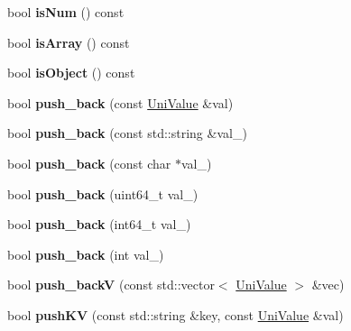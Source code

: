 \begin{DoxyCompactItemize}
bool {\bfseries is\+Num} () const
\item 
\mbox{\label{class_uni_value_a1d2e9479d4fb330a73e0fd41197aec35}} 
bool {\bfseries is\+Array} () const
\item 
\mbox{\label{class_uni_value_af1a6df88c2bee59a863dd6f8d12e9be5}} 
bool {\bfseries is\+Object} () const
\item 
\mbox{\label{class_uni_value_a944cd1b59b040cd24c9f46b55a68d49a}} 
bool {\bfseries push\+\_\+back} (const \mbox{\hyperlink{class_uni_value}{Uni\+Value}} \&val)
\item 
\mbox{\label{class_uni_value_aac788eaa2c8b8b7849ecfc2f111e3cf2}} 
bool {\bfseries push\+\_\+back} (const std\+::string \&val\+\_\+)
\item 
\mbox{\label{class_uni_value_af2a559718c1c8e092db707a19667f9ea}} 
bool {\bfseries push\+\_\+back} (const char $\ast$val\+\_\+)
\item 
\mbox{\label{class_uni_value_af4abadace527f43bd35d25b7360a8b29}} 
bool {\bfseries push\+\_\+back} (uint64\+\_\+t val\+\_\+)
\item 
\mbox{\label{class_uni_value_a6a7da3246734ad6ff3ef1aa397c43d9f}} 
bool {\bfseries push\+\_\+back} (int64\+\_\+t val\+\_\+)
\item 
\mbox{\label{class_uni_value_a09f6fa88d30b4cee379c8391a070b932}} 
bool {\bfseries push\+\_\+back} (int val\+\_\+)
\item 
\mbox{\label{class_uni_value_ad3e16e8076509d1c8683f22df04e14d1}} 
bool {\bfseries push\+\_\+backV} (const std\+::vector$<$ \mbox{\hyperlink{class_uni_value}{Uni\+Value}} $>$ \&vec)
\item 
\mbox{\label{class_uni_value_abab649c2dbd593233de6364254456026}} 
bool {\bfseries push\+KV} (const std\+::string \&key, const \mbox{\hyperlink{class_uni_value}{Uni\+Value}} \&val)
\item 
\mbox{\label{class_uni_value_abe869f1ec6d244f7bb4f5e3e42648315}} 

\end{DoxyCompactItemize}
